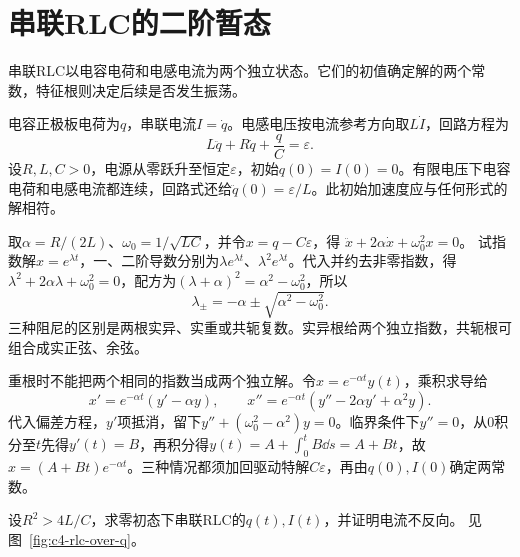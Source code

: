 \section{串联RLC的二阶暂态}\label{sec:c4-rlc}
串联RLC以电容电荷和电感电流为两个独立状态。它们的初值确定解的两个常数，特征根则决定后续是否发生振荡。

电容正极板电荷为$q$，串联电流$I=\dot q$。电感电压按电流参考方向取$L\dot I$，回路方程为
\[
 L\ddot q+R\dot q+\frac qC=\varepsilon.
\]
设$R,L,C>0$，电源从零跃升至恒定$\varepsilon$，初始$q(0)=I(0)=0$。有限电压下电容电荷和电感电流都连续，回路式还给$\ddot q(0)=\varepsilon/L$。此初始加速度应与任何形式的解相符。

取$\alpha=R/(2L)$、$\omega_0=1/\sqrt{LC}$，并令$x=q-C\varepsilon$，得
$\ddot x+2\alpha\dot x+\omega_0^2x=0$。
试指数解$x=e^{\lambda t}$，一、二阶导数分别为$\lambda e^{\lambda t}$、$\lambda^2e^{\lambda t}$。代入并约去非零指数，得$\lambda^2+2\alpha\lambda+\omega_0^2=0$，配方为$(\lambda+\alpha)^2=\alpha^2-\omega_0^2$，所以
\[
 \lambda_\pm=-\alpha\pm\sqrt{\alpha^2-\omega_0^2}.
\]
三种阻尼的区别是两根实异、实重或共轭复数。实异根给两个独立指数，共轭根可组合成实正弦、余弦。

重根时不能把两个相同的指数当成两个独立解。令$x=e^{-\alpha t}y(t)$，乘积求导给
\[
 x'=e^{-\alpha t}(y'-\alpha y),\qquad
 x''=e^{-\alpha t}(y''-2\alpha y'+\alpha^2y).
\]
代入偏差方程，$y'$项抵消，留下$y''+(\omega_0^2-\alpha^2)y=0$。临界条件下$y''=0$，从$0$积分至$t$先得$y'(t)=B$，再积分得$y(t)=A+\int_0^tB\dd s=A+Bt$，故$x=(A+Bt)e^{-\alpha t}$。三种情况都须加回驱动特解$C\varepsilon$，再由$q(0),I(0)$确定两常数。

\begin{example}[过阻尼阶跃]\label{ex:c4-rlc-over}
设$R^2>4L/C$，求零初态下串联RLC的$q(t),I(t)$，并证明电流不反向。 见图~\ref{fig:c4-rlc-over-q}。
\end{example}


